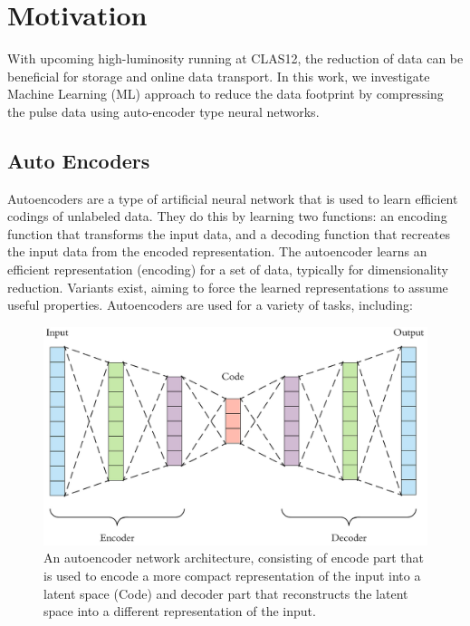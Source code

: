 \section{Motivation}

With upcoming high-luminosity running at CLAS12, the reduction of data can be beneficial for storage and online data transport.
In this work, we investigate Machine Learning (ML) approach to reduce the data footprint by compressing the pulse data using auto-encoder
type neural networks.

\subsection{Auto Encoders}

Autoencoders are a type of artificial neural network that is used to learn efficient codings of unlabeled data. They do this by learning two functions: an encoding function that transforms the input data, and a decoding function that recreates the input data from the encoded representation. The autoencoder learns an efficient representation (encoding) for a set of data, typically for dimensionality reduction. Variants exist, aiming to force the learned representations to assume useful properties.
Autoencoders are used for a variety of tasks, including:

\begin{figure}[h!]
\centering
\includegraphics[width=0.6\columnwidth]{auto-encoders.png}
\caption{An autoencoder network architecture, consisting of encode part that is used to encode a more compact representation of the input into a latent space (Code) and
decoder part that reconstructs the latent space into a different representation of the input.} 
\label{fig:aeDiagram}
\end{figure}

